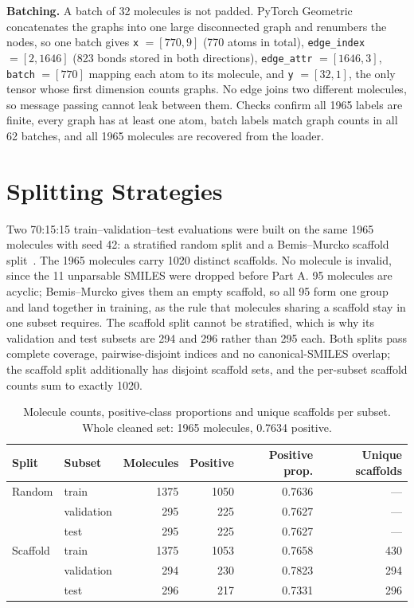 \documentclass[10pt,a4paper]{article}
\begin{document}
\textbf{Batching.} A batch of 32 molecules is not padded. PyTorch Geometric concatenates the graphs into one large disconnected graph and renumbers the nodes, so one batch gives \texttt{x} $=[770, 9]$ (770 atoms in total), \texttt{edge\_index} $=[2, 1646]$ (823 bonds stored in both directions), \texttt{edge\_attr} $=[1646, 3]$, \texttt{batch} $=[770]$ mapping each atom to its molecule, and \texttt{y} $=[32, 1]$, the only tensor whose first dimension counts graphs. No edge joins two different molecules, so message passing cannot leak between them. Checks confirm all 1965 labels are finite, every graph has at least one atom, batch labels match graph counts in all 62 batches, and all 1965 molecules are recovered from the loader.

\section{Splitting Strategies}
Two 70:15:15 train--validation--test evaluations were built on the same 1965 molecules with seed 42: a stratified random split and a Bemis--Murcko scaffold split~\cite{bemis1996}. The 1965 molecules carry 1020 distinct scaffolds. No molecule is invalid, since the 11 unparsable SMILES were dropped before Part A. 95 molecules are acyclic; Bemis--Murcko gives them an empty scaffold, so all 95 form one group and land together in training, as the rule that molecules sharing a scaffold stay in one subset requires. The scaffold split cannot be stratified, which is why its validation and test subsets are 294 and 296 rather than 295 each. Both splits pass complete coverage, pairwise-disjoint indices and no canonical-SMILES overlap; the scaffold split additionally has disjoint scaffold sets, and the per-subset scaffold counts sum to exactly 1020.

\begin{table}[H]
\centering
\caption{Molecule counts, positive-class proportions and unique scaffolds per subset. Whole cleaned set: 1965 molecules, 0.7634 positive.}
\label{tab:splits}
\small
\begin{tabular}{llrrrr}
\toprule
Split & Subset & Molecules & Positive & Positive prop. & Unique scaffolds\\
\midrule
Random & train & 1375 & 1050 & 0.7636 & ---\\
 & validation & 295 & 225 & 0.7627 & ---\\
 & test & 295 & 225 & 0.7627 & ---\\
\midrule
Scaffold & train & 1375 & 1053 & 0.7658 & 430\\
 & validation & 294 & 230 & 0.7823 & 294\\
 & test & 296 & 217 & 0.7331 & 296\\
\bottomrule
\end{tabular}
\end{table}
\end{document}
